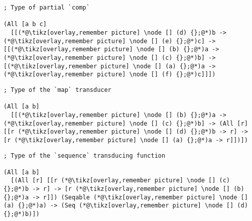\documentclass[9pt]{extarticle}
\begin{document}
\begin{lstlisting}
; Type of partial `comp`

(All [a b c]
  [[(*@\tikz[overlay,remember picture] \node [] (d) {};@*)b -> (*@\tikz[overlay,remember picture] \node [] (e) {};@*)c] -> [[(*@\tikz[overlay,remember picture] \node [] (b) {};@*)a -> (*@\tikz[overlay,remember picture] \node [] (c) {};@*)b] -> [(*@\tikz[overlay,remember picture] \node [] (a) {};@*)a -> (*@\tikz[overlay,remember picture] \node [] (f) {};@*)c]]])
\end{lstlisting}

\begin{lstlisting}
; Type of the `map` transducer

(All [a b]
  [[(*@\tikz[overlay,remember picture] \node [] (b) {};@*)a -> (*@\tikz[overlay,remember picture] \node [] (c) {};@*)b] -> (All [r] [[r (*@\tikz[overlay,remember picture] \node [] (d) {};@*)b -> r] -> [r (*@\tikz[overlay,remember picture] \node [] (a) {};@*)a -> r]])])
\end{lstlisting}

\begin{lstlisting}
; Type of the `sequence` transducing function

(All [a b]
  [(All [r] [[r (*@\tikz[overlay,remember picture] \node [] (c) {};@*)b -> r] -> [r (*@\tikz[overlay,remember picture] \node [] (b) {};@*)a -> r]]) (Seqable (*@\tikz[overlay,remember picture] \node [] (a) {};@*)a) -> (Seq (*@\tikz[overlay,remember picture] \node [] (d) {};@*)b)])
\end{lstlisting}
\end{document}
